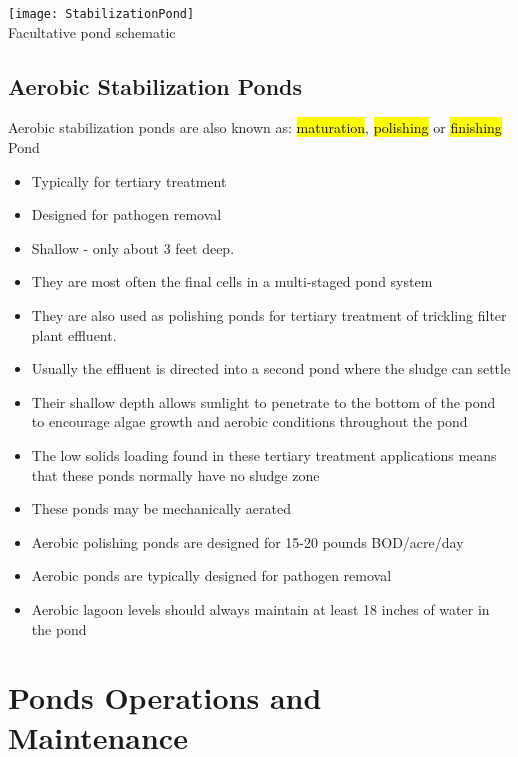 				\begin{sidewaysfigure}
\begin{center}
\texttt{[image: StabilizationPond]}\\
Facultative pond schematic
\end{center}
				\end{sidewaysfigure}
				
\subsection{Aerobic Stabilization Ponds}
	
Aerobic stabilization ponds are also known as: \hl{maturation}, \hl{polishing} or \hl{finishing} Pond
\begin{itemize}
\item Typically for tertiary treatment
\item Designed for pathogen removal
\item Shallow - only about 3 feet deep. 
\item They are most often the final cells in a multi-staged pond system
\item They are also used as polishing ponds for tertiary treatment of trickling filter plant effluent.
\item Usually the effluent is directed into a second pond where the sludge can settle 
\item Their shallow depth allows sunlight to penetrate to the bottom of the pond to encourage algae growth and aerobic conditions throughout the pond 
\item The low solids loading found in these tertiary treatment applications means that these ponds normally have no sludge zone
\item These ponds may be mechanically aerated 
\item Aerobic polishing ponds are designed for 15-20 pounds BOD/acre/day
\item Aerobic ponds are typically designed for pathogen removal
\item Aerobic lagoon levels should always maintain at least 18 inches of water in the pond
\end{itemize}



\section{Ponds Operations and Maintenance}


